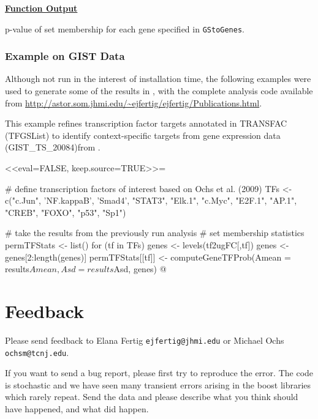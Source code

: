 \documentclass{report}
\begin{document}
\par \noindent \textbf{\underline{Function Output}}
\begin{description}
\item p-value of set membership for each gene specified in \texttt{GStoGenes}.
\end{description}

\subsection{Example on GIST Data}

\par Although not run in the interest of installation time, the following examples were used to generate some of the results in \cite{Fertig2012}, with the complete analysis code available from \url{http://astor.som.jhmi.edu/~ejfertig/ejfertig/Publications.html}.

\par This example refines transcription factor targets annotated in TRANSFAC (TFGSList) to identify context-specific targets from gene expression data (GIST\_TS\_20084)from \cite{Ochs2009}.  

<<eval=FALSE, keep.source=TRUE>>=

# define transcription factors of interest based on Ochs et al. (2009)
TFs <- c("c.Jun", 'NF.kappaB', 'Smad4', "STAT3", "Elk.1", "c.Myc", "E2F.1",
         "AP.1", "CREB", "FOXO", "p53", "Sp1")

# take the results from the previously run analysis
# set membership statistics
permTFStats <- list()
for (tf in TFs) {
     genes <- levels(tf2ugFC[,tf])
     genes <- genes[2:length(genes)]
     permTFStats[[tf]] <- computeGeneTFProb(Amean = results$Amean,
                                            Asd = results$Asd, genes)
}
@

\chapter{Feedback}

\par Please send feedback to Elana Fertig \texttt{ejfertig@jhmi.edu} or Michael Ochs \texttt{ochsm@tcnj.edu}.

\par If you want to send a bug report, please first try to reproduce the error.  The code is stochastic and we have seen many transient errors arising in the boost libraries which rarely repeat.  Send the data and please describe what you think should have happened, and what did happen.
\end{document}
